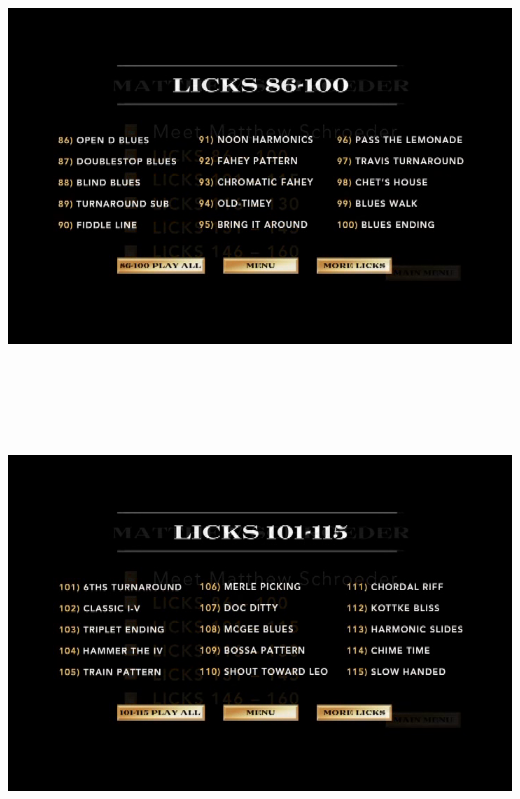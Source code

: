 \documentclass[a4paper]{book}
\begin{document}
\begin{center}
\includegraphics[width=17cm,height=11.333cm]{lebluessupportsmethodes-img8.png}
\end{center}



\clearpage

\begin{center}
\includegraphics[width=17cm,height=11.333cm]{lebluessupportsmethodes-img9.png}
\end{center}
\end{document}
